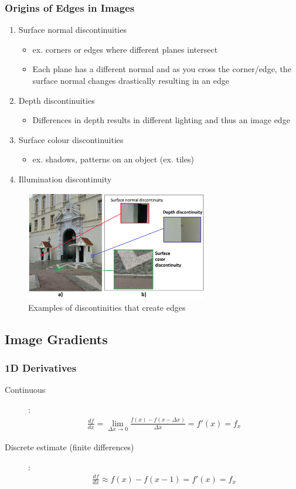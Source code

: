 \documentclass[letterpaper,12pt]{article}
\begin{document}
\subsubsection{Origins of Edges in Images}
\begin{enumerate}
 \item Surface normal discontinuities
       \begin{itemize}
        \item ex. corners or edges where different planes intersect
        \item Each plane has a different normal and as you cross the corner/edge, the surface normal changes drastically resulting in an edge
       \end{itemize}
 \item Depth discontinuities
       \begin{itemize}
        \item Differences in depth results in different lighting and thus an image edge
       \end{itemize}
 \item Surface colour discontinuities
       \begin{itemize}
        \item ex. shadows, patterns on an object (ex. tiles)
       \end{itemize}
 \item Illumination discontinuity
\end{enumerate}
\begin{figure}[H]
 \centering
 \includegraphics[width=8cm]{images/discontinuities.png}
 \caption{Examples of discontinities that create edges}
\end{figure}

\subsection{Image Gradients}
\subsubsection{1D Derivatives}
\begin{description}
 \item[Continuous]:
       \begin{align}
        \frac{df}{dx} = \lim_{\Delta x \to 0} \frac{f(x) - f(x-\Delta x)}{\Delta x} = f'(x) = f_x
       \end{align}
 \item[Discrete estimate (finite differences)]:
       \begin{align}
        \frac{df}{dx} \approx f(x) - f(x-1) = f'(x) = f_x
       \end{align}
\end{description}
\end{document}
